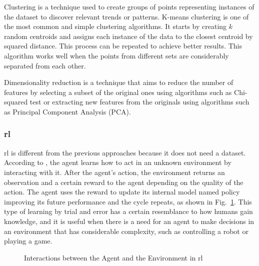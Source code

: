 Clustering is a technique used to create groups of points representing instances of the dataset to discover relevant trends or patterns. K-means clustering is one of the most common and simple clustering algorithms. It starts by creating $k$ random centroids and assigns each instance of the data to the closest centroid by squared distance. This process can be repeated to achieve better results. This algorithm works well when the points from different sets are considerably separated from each other.

Dimensionality reduction is a technique that aims to reduce the number of features by selecting a subset of the original ones using algorithms such as Chi-squared test or extracting new features from the originals using algorithms such as Principal Component Analysis (PCA).


\subsubsection{\acf{rl}}

\acl{rl} is different from the previous approaches because it does not need a dataset. According to \textcite{Alom2019}, the agent learns how to act in an unknown environment by interacting with it. After the agent's action, the environment returns an observation and a certain reward to the agent depending on the quality of the action. The agent uses the reward to update its internal model named policy improving its future performance and the cycle repeats, as shown in Fig.~\ref{rl_diagram}. This type of learning by trial and error has a certain resemblance to how humans gain knowledge, and it is useful when there is a need for an agent to make decisions in an environment that has considerable complexity, such as controlling a robot or playing a game.

\begin{figure}[!ht]
\centering
\caption[Interactions between the Agent and the Environment in \acs{rl}]{Interactions between the Agent and the Environment in \acs{rl} \cite{Alom2019}}
\label{rl_diagram}
\end{figure}


